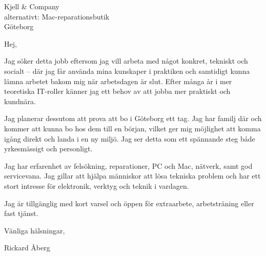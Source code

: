 \documentclass[a4paper,10pt]{letter}
\begin{document}
\begin{letter}{Kjell \& Company \\ alternativt: Mac-reparationsbutik \\ Göteborg}
\opening{Hej,}

Jag söker detta jobb eftersom jag vill arbeta med något konkret, tekniskt och socialt – där jag får använda mina kunskaper i praktiken och samtidigt kunna lämna arbetet bakom mig när arbetsdagen är slut. Efter många år i mer teoretiska IT-roller känner jag ett behov av att jobba mer praktiskt och kundnära.

Jag planerar dessutom att prova att bo i Göteborg ett tag. Jag har familj där och kommer att kunna bo hos dem till en början, vilket ger mig möjlighet att komma igång direkt och landa i en ny miljö. Jag ser detta som ett spännande steg både yrkesmässigt och personligt.

Jag har erfarenhet av felsökning, reparationer, PC och Mac, nätverk, samt god servicevana. Jag gillar att hjälpa människor att lösa tekniska problem och har ett stort intresse för elektronik, verktyg och teknik i vardagen.

Jag är tillgänglig med kort varsel och öppen för extraarbete, arbetsträning eller fast tjänst.

\closing{Vänliga hälsningar,}

\vspace{1em}

Rickard Åberg\\
[0709431401] \\
[raberg@duck.com]
\end{letter}
\end{document}
